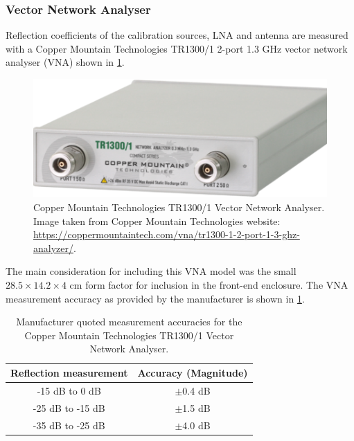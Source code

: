 \subsubsection{Vector Network Analyser}
Reflection coefficients of the calibration sources, LNA and antenna are measured with a Copper Mountain Technologies TR1300/1 2-port 1.3 GHz vector network analyser (VNA) shown in \cref{fig:vna}.
\begin{figure}
    \centering
    \includegraphics[scale=0.5]{vna}
    \caption{Copper Mountain Technologies TR1300/1 Vector Network Analyser. Image taken from Copper Mountain Technologies website: \url{https://coppermountaintech.com/vna/tr1300-1-2-port-1-3-ghz-analyzer/}.}
    \label{fig:vna}
\end{figure}
The main consideration for including this VNA model was the small $28.5 \times 14.2 \times 4$ cm form factor for inclusion in the front-end enclosure. The VNA measurement accuracy as provided by the manufacturer is shown in \cref{tab:vna_acc}.
\begin{table}
    \begin{center}
    \begin{tabular}{ |c|c| }
    \hline
    Reflection measurement & Accuracy (Magnitude) \\
    \hline
    -15 dB to 0 dB & $\pm$0.4 dB \\
    -25 dB to -15 dB & $\pm$1.5 dB \\
    -35 dB to -25 dB & $\pm$4.0 dB \\
    \hline
    \end{tabular}
    \caption{Manufacturer quoted measurement accuracies for the Copper Mountain Technologies TR1300/1 Vector Network Analyser.}
    \label{tab:vna_acc}
    \end{center}
\end{table}

